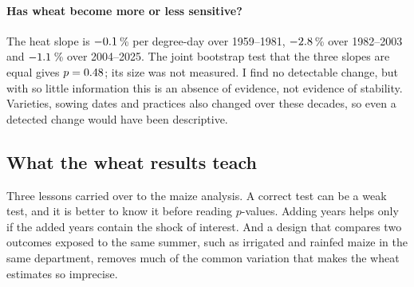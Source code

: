 \paragraph{Has wheat become more or less sensitive?} The heat slope is $-0.1$\,\% per degree-day over 1959--1981, $-2.8$\,\% over 1982--2003 and $-1.1$\,\% over 2004--2025. The joint bootstrap test that the three slopes are equal gives $p = 0.48$; its size was not measured. I find no detectable change, but with so little information this is an absence of evidence, not evidence of stability. Varieties, sowing dates and practices also changed over these decades, so even a detected change would have been descriptive.

\subsection{What the wheat results teach}

Three lessons carried over to the maize analysis. A correct test can be a weak test, and it is better to know it before reading $p$-values. Adding years helps only if the added years contain the shock of interest. And a design that compares two outcomes exposed to the same summer, such as irrigated and rainfed maize in the same department, removes much of the common variation that makes the wheat estimates so imprecise.
